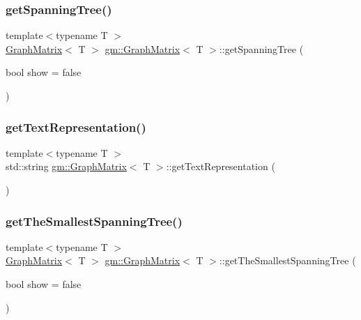 \mbox{\label{classgm_1_1_graph_matrix_a490a9ef8eb86acc75c42a97cf5dbb368}} 
\subsubsection{\texorpdfstring{get\+Spanning\+Tree()}{getSpanningTree()}}
{\footnotesize\ttfamily template$<$typename T $>$ \\
\mbox{\hyperlink{classgm_1_1_graph_matrix}{Graph\+Matrix}}$<$ T $>$ \mbox{\hyperlink{classgm_1_1_graph_matrix}{gm\+::\+Graph\+Matrix}}$<$ T $>$\+::get\+Spanning\+Tree (\begin{DoxyParamCaption}\item[{bool}]{show = {\ttfamily false} }\end{DoxyParamCaption})}

\mbox{\label{classgm_1_1_graph_matrix_a58ac0e38794e668383319945b3c59f08}} 
\subsubsection{\texorpdfstring{get\+Text\+Representation()}{getTextRepresentation()}}
{\footnotesize\ttfamily template$<$typename T $>$ \\
std\+::string \mbox{\hyperlink{classgm_1_1_graph_matrix}{gm\+::\+Graph\+Matrix}}$<$ T $>$\+::get\+Text\+Representation (\begin{DoxyParamCaption}{ }\end{DoxyParamCaption})}

\mbox{\label{classgm_1_1_graph_matrix_a8e60714a5f3b6fae8c04be67bbf8b56c}} 
\subsubsection{\texorpdfstring{get\+The\+Smallest\+Spanning\+Tree()}{getTheSmallestSpanningTree()}}
{\footnotesize\ttfamily template$<$typename T $>$ \\
\mbox{\hyperlink{classgm_1_1_graph_matrix}{Graph\+Matrix}}$<$ T $>$ \mbox{\hyperlink{classgm_1_1_graph_matrix}{gm\+::\+Graph\+Matrix}}$<$ T $>$\+::get\+The\+Smallest\+Spanning\+Tree (\begin{DoxyParamCaption}\item[{bool}]{show = {\ttfamily false} }\end{DoxyParamCaption})}

